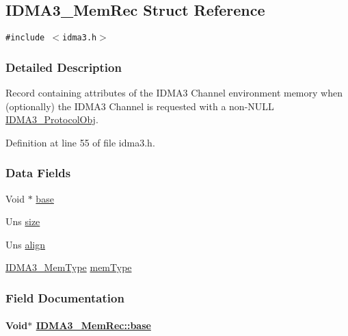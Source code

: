 \hypertarget{struct_i_d_m_a3___mem_rec}{
\subsection{IDMA3\_\-Mem\-Rec Struct Reference}
\label{struct_i_d_m_a3___mem_rec}
}
{\tt \#include $<$idma3.h$>$}



\subsubsection{Detailed Description}
Record containing attributes of the IDMA3 Channel environment memory when (optionally) the IDMA3 Channel is requested with a non-NULL \hyperlink{struct_i_d_m_a3___protocol_obj}{IDMA3\_\-Protocol\-Obj}. 



Definition at line 55 of file idma3.h.\subsubsection*{Data Fields}
\begin{CompactItemize}
\item 
Void $\ast$ \hyperlink{struct_i_d_m_a3___mem_rec_2b6835f2ed01fd1ffc7e45c5daa04de1}{base}
\item 
Uns \hyperlink{struct_i_d_m_a3___mem_rec_667c10232578b390f66e698d796b4d2d}{size}
\item 
Uns \hyperlink{struct_i_d_m_a3___mem_rec_18a74cc1005f251748f198ff09f8e76f}{align}
\item 
\hyperlink{group___d_s_p_i_d_m_a3_gbe0577eecc288b36121382daa765093a}{IDMA3\_\-Mem\-Type} \hyperlink{struct_i_d_m_a3___mem_rec_6036233a20bd80fe13a6921db305ee9d}{mem\-Type}
\end{CompactItemize}


\subsubsection{Field Documentation}
\hypertarget{struct_i_d_m_a3___mem_rec_2b6835f2ed01fd1ffc7e45c5daa04de1}{
\paragraph[base]{\setlength{\rightskip}{0pt plus 5cm}Void$\ast$ \hyperlink{struct_i_d_m_a3___mem_rec_2b6835f2ed01fd1ffc7e45c5daa04de1}{IDMA3\_\-Mem\-Rec::base}}\hfill}
\label{struct_i_d_m_a3___mem_rec_2b6835f2ed01fd1ffc7e45c5daa04de1}


